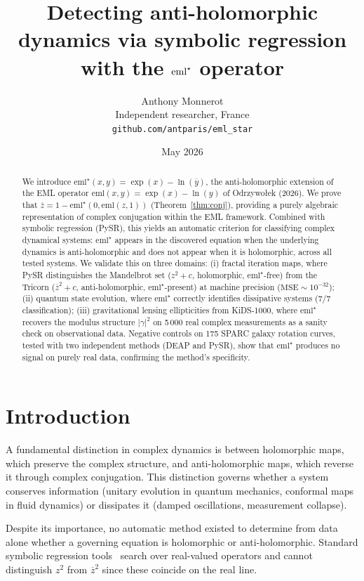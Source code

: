 \documentclass[12pt,a4paper]{article}
\title{Detecting anti-holomorphic dynamics via symbolic regression\\
with the $\emlstar$ operator}
\author{Anthony Monnerot\\
Independent researcher, France\\
\texttt{github.com/antparis/eml\_star}}
\date{May 2026}
\newcommand{\emlstar}{\mathrm{eml}^{\star}}
\newcommand{\eml}{\mathrm{eml}}
\newcommand{\conj}[1]{\overline{#1}}
\begin{document}
\maketitle

\begin{abstract}
We introduce $\emlstar(x,y) = \exp(x) - \ln(\conj{y})$,
the anti-holomorphic extension of the EML operator
$\eml(x,y) = \exp(x) - \ln(y)$ of Odrzywołek (2026).
We prove that $\conj{z} = 1 - \emlstar(0, \eml(z,1))$
(Theorem~\ref{thm:conj}), providing a purely algebraic
representation of complex conjugation within the EML framework.
Combined with symbolic regression (PySR), this yields an automatic
criterion for classifying complex dynamical systems:
$\emlstar$ appears in the discovered equation when the underlying
dynamics is anti-holomorphic and does not appear when it is
holomorphic, across all tested systems.
We validate this on three domains: (i) fractal iteration maps,
where PySR distinguishes the Mandelbrot set ($z^2+c$, holomorphic,
$\emlstar$-free) from the Tricorn ($\conj{z}^2+c$, anti-holomorphic,
$\emlstar$-present) at machine precision ($\mathrm{MSE} \sim 10^{-32}$);
(ii) quantum state evolution, where $\emlstar$ correctly identifies
dissipative systems (7/7 classification);
(iii) gravitational lensing ellipticities from KiDS-1000,
where $\emlstar$ recovers the modulus structure $|\gamma|^2$ on
5\,000 real complex measurements as a sanity check on observational data.
Negative controls on 175 SPARC galaxy rotation curves,
tested with two independent methods (DEAP and PySR),
show that $\emlstar$ produces no signal on purely real data,
confirming the method's specificity.
\end{abstract}


\section{Introduction}
\label{sec:intro}

A fundamental distinction in complex dynamics is between holomorphic
maps, which preserve the complex structure, and anti-holomorphic maps,
which reverse it through complex conjugation.
This distinction governs whether a system conserves information
(unitary evolution in quantum mechanics, conformal maps in fluid
dynamics) or dissipates it (damped oscillations, measurement collapse).

Despite its importance, no automatic method existed to determine
from data alone whether a governing equation is holomorphic or
anti-holomorphic.
Standard symbolic regression tools~\citep{cranmer2023pysr} search over
real-valued operators and cannot distinguish $z^2$ from $\conj{z}^2$
since these coincide on the real line.
\end{document}
